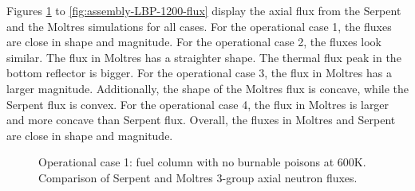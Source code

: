 Figures \ref{fig:assembly-noLBP-600-flux} to \ref{fig:assembly-LBP-1200-flux} display the axial flux from the Serpent and the Moltres simulations for all cases.
For the operational case 1, the fluxes are close in shape and magnitude.
For the operational case 2, the fluxes look similar.
The flux in Moltres has a straighter shape.
The thermal flux peak in the bottom reflector is bigger.
For the operational case 3, the flux in Moltres has a larger magnitude.
Additionally, the shape of the Moltres flux is concave, while the Serpent flux is convex.
For the operational case 4, the flux in Moltres is larger and more concave than Serpent flux.
Overall, the fluxes in Moltres and Serpent are close in shape and magnitude.

\begin{figure}[htbp!]
	\centering
	\hfill
  \caption{Operational case 1: fuel column with no burnable poisons at 600K. Comparison of Serpent and Moltres 3-group axial neutron fluxes.}
	\label{fig:assembly-noLBP-600-flux}
\end{figure}

